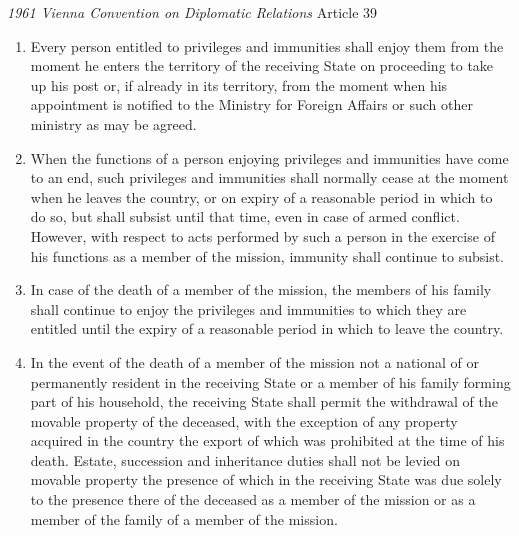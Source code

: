 \begin{conventiondetails}{\textit{1961 Vienna Convention on Diplomatic Relations} Article 39}
    \flushleft
    \begin{enumerate}
        \item Every person entitled to privileges and immunities shall enjoy them from the moment he enters the territory of the receiving State on proceeding to take up his post or, if already in its territory, from the moment when his appointment is notified to the Ministry for Foreign Affairs or such other ministry as may be agreed.
        \item When the functions of a person enjoying privileges and immunities have come to an end,  such privileges and immunities shall normally cease at the moment when he leaves the country, or on expiry of a reasonable period in which to do so, but shall subsist until that time, even in case of armed conflict. However, with respect to acts performed by such a person in the exercise of his functions as a member of the mission, immunity shall continue to subsist.
        \item In case of the death of a member of the mission, the members of his family shall continue to enjoy the privileges and immunities to which they are entitled until the expiry of a reasonable period in which to leave the country.
        \item  In the event of the death of a member of the mission not a national of or permanently resident in the receiving State or a member of his family forming part of his household, the receiving State shall permit the withdrawal of the movable property of the deceased, with the exception of any property acquired in the country the export of which was prohibited at the time of his death. Estate, succession and inheritance duties shall not be levied on movable property the presence of which in the receiving State was due solely to the presence there of the deceased as a member of the mission or as a member of the family of a member of the mission.
    \end{enumerate}
\end{conventiondetails}

